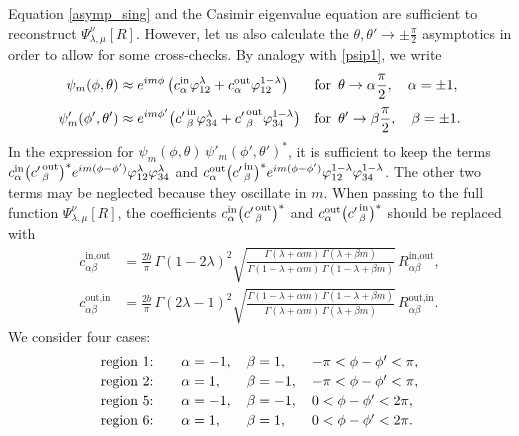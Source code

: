 \documentclass[12pt]{article}
\newcommand{\lt}{\left}
\newcommand{\rt}{\right}
\newcommand{\vp}{\varphi}
\newcommand{\IN}{\text{in}}
\newcommand{\OUT}{\text{out}}
\begin{document}
Equation \eqref{asymp_sing} and the Casimir eigenvalue equation are sufficient to reconstruct $\Psi^{\nu}_{\lambda,\mu}[R]$. However, let us also calculate the $\theta,\theta'\to\pm\frac{\pi}{2}$ asymptotics in order to allow for some cross-checks. By analogy with \eqref{psip1}, we write
\begin{equation}
\begin{aligned}
\psi_m(\phi,\theta) &\approx e^{im\phi}
\lt( c^{\IN}_{\alpha}\vp_{12}^{\lambda}
+c^{\OUT}_{\alpha}\vp_{12}^{1-\lambda} \rt)
&& \text{for }\, \theta\to\alpha\frac{\pi}{2},\quad \alpha=\pm 1,
\\[2pt]
\psi'_m(\phi',\theta') &\approx e^{im\phi'}
\bigl({c'\kern1pt}^{\IN}_{\beta}\vp_{34}^{\lambda}
+{c'\kern1pt}^{\OUT}_{\beta}\vp_{34}^{1-\lambda}\bigr)
&& \text{for }\, \theta'\to\beta\frac{\pi}{2},\quad \beta=\pm 1.
\end{aligned}
\end{equation}
In the expression for $\psi_m(\phi,\theta)\,\psi'_m(\phi',\theta')^*$, it is sufficient to keep the terms $c^{\IN}_{\alpha}\bigl({c'\kern1pt}^{\OUT}_{\beta}\bigr)^{*} e^{im(\phi-\phi')} \vp_{12}^{\lambda}\vp_{34}^{\lambda}$ and $c^{\OUT}_{\alpha}\bigl({c'\kern1pt}^{\IN}_{\beta}\bigr)^{*} e^{im(\phi-\phi' )} \vp_{12}^{1-\lambda}\vp_{34}^{1-\lambda}$. The other two terms may be neglected because they oscillate in $m$. When passing to the full function $\Psi^{\nu}_{\lambda,\mu}[R]$, the coefficients $c^{\IN}_{\alpha} \bigl( {c'\kern1pt}^{\OUT}_{\beta} \bigr)^{*}$ and $c^{\OUT}_{\alpha} \bigl( {c'\kern1pt}^{\IN}_{\beta} \bigr)^{*}$ should be replaced with
\begin{equation}
\begin{aligned}
c^{\IN,\OUT}_{\alpha\beta} &=\frac{2b}{\pi}\,\Gamma(1-2\lambda)^2
\sqrt{\frac{\Gamma(\lambda+\alpha m)\,\Gamma(\lambda+\beta m)}
{\Gamma(1-\lambda+\alpha m)\,\Gamma(1-\lambda+\beta m)}}\,
R^{\IN,\OUT}_{\alpha\beta},\\[3pt]
c^{\OUT,\IN}_{\alpha\beta} &=\frac{2b}{\pi}\,\Gamma(2\lambda-1)^2
\sqrt{\frac{\Gamma(1-\lambda+\alpha m)\,\Gamma(1-\lambda+\beta m)}
{\Gamma(\lambda+\alpha m)\,\Gamma(\lambda+\beta m)}}\,
R^{\OUT,\IN}_{\alpha\beta}.
\end{aligned}
\end{equation}
We consider four cases:
\begin{equation}
\begin{array}{@{}l@{\qquad}l@{\quad\,}l@{\quad\,}l@{}}
\text{region $1$:} & \alpha=-1, & \beta=1, & -\pi<\phi-\phi'<\pi,\\[2pt]
\text{region $2$:} & \alpha=1, & \beta=-1, & -\pi<\phi-\phi'<\pi,\\[2pt]
\text{region $5$:} & \alpha=-1, & \beta=-1, & 0<\phi-\phi'<2\pi,\\[2pt]
\text{region $6$:} & \alpha=1, & \beta=1, & 0<\phi-\phi'<2\pi.
\end{array}
\end{equation}
\end{document}

